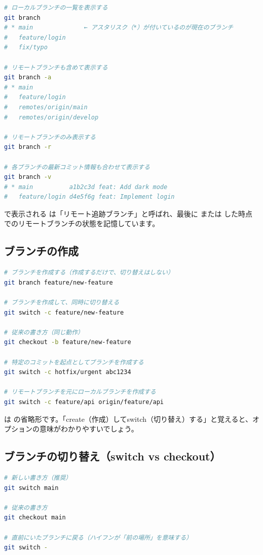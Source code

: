 \begin{lstlisting}[language=bash]
# ローカルブランチの一覧を表示する
git branch
# * main              ← アスタリスク（*）が付いているのが現在のブランチ
#   feature/login
#   fix/typo

# リモートブランチも含めて表示する
git branch -a
# * main
#   feature/login
#   remotes/origin/main
#   remotes/origin/develop

# リモートブランチのみ表示する
git branch -r

# 各ブランチの最新コミット情報も合わせて表示する
git branch -v
# * main          a1b2c3d feat: Add dark mode
#   feature/login d4e5f6g feat: Implement login
\end{lstlisting}

 で表示される  は「リモート追跡ブランチ」と呼ばれ、最後に  または  した時点でのリモートブランチの状態を記憶しています。

\subsection{ブランチの作成}

\begin{lstlisting}[language=bash]
# ブランチを作成する（作成するだけで、切り替えはしない）
git branch feature/new-feature

# ブランチを作成して、同時に切り替える
git switch -c feature/new-feature

# 従来の書き方（同じ動作）
git checkout -b feature/new-feature

# 特定のコミットを起点としてブランチを作成する
git switch -c hotfix/urgent abc1234

# リモートブランチを元にローカルブランチを作成する
git switch -c feature/api origin/feature/api
\end{lstlisting}

 は  の省略形です。「create（作成）してswitch（切り替え）する」と覚えると、オプションの意味がわかりやすいでしょう。

\subsection{ブランチの切り替え（switch vs checkout）}

\begin{lstlisting}[language=bash]
# 新しい書き方（推奨）
git switch main

# 従来の書き方
git checkout main

# 直前にいたブランチに戻る（ハイフンが「前の場所」を意味する）
git switch -
\end{lstlisting}

